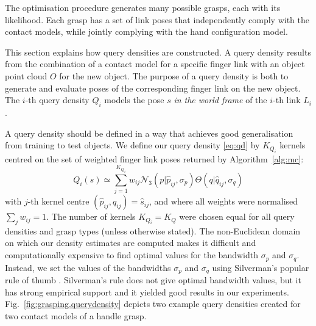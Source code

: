 \documentclass[a4paper, 10pt, conference]{ieeeconf}      %
\newcommand{\alg}{Algorithm~}
\newcommand{\fig}{Fig.~}
\newcommand{\rl}{L}
\newcommand{\om}{O}
\newcommand{\qd}{Q}
\begin{document}

The optimisation procedure generates many possible grasps, each with its likelihood. Each grasp has a set of link poses that independently comply with the contact models, while jointly complying with the hand configuration model.

This section explains how query densities are constructed. A query density results from the combination of a contact model for a specific finger link with an object point cloud $\om$ for the new object. The purpose of a query density is both to generate and evaluate poses of the corresponding finger link on the new object. The $i$-th query density $\qd_i$ models the pose $s$ {\em in the world frame} of the $i$-th link $\rl_i$.

A query density should be defined in a way that achieves good generalisation from training to test objects. We define our query density \eqref{eq:qd} by $K_{Q_i}$ kernels centred on the set of weighted finger link poses returned by \alg\ref{alg:mc}:
\begin{equation}
\qd_i(s) \simeq \sum^{K_{Q_i}}_{j=1} w_{ij} \mathcal{N}_3(p|{\hat{p}_{ij}}, \sigma_{p}) \Theta(q|{\hat{q}_{ij}}, \sigma_{q})%
\label{eq:qd.approx}
\end{equation}
with $j$-th kernel centre $({\hat{p}_{ij}}, {\hat{q}_{ij}}) = \hat{s}_{ij}$, and where all weights were normalised $\sum_j w_{ij} = 1$. The number of kernels $K_{Q_i} = K_Q$ were chosen equal for all query densities and grasp types (unless otherwise stated). The non-Euclidean domain on which our density estimates are computed makes it difficult and computationally expensive to find optimal values for the bandwidth $\sigma_{p}$ and $\sigma_{q}$. Instead, we set the values of the bandwidths $\sigma_{p}$ and $\sigma_{q}$ using Silverman's popular rule of thumb \cite{silverman}. Silverman's rule does not give optimal bandwidth values, but it has strong empirical support and it yielded good results in our experiments. \fig\ref{fig:grasping.querydensity} depicts two example query densities created for two contact models of a handle grasp.
\end{document}
